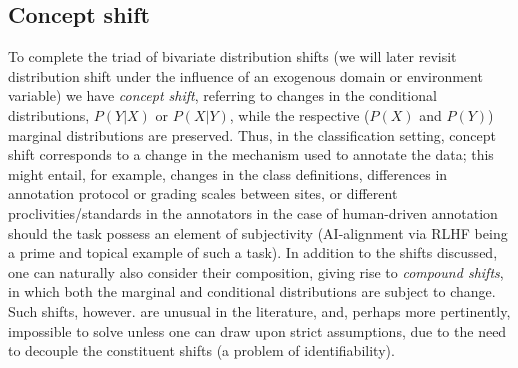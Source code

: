 \subsection{Concept shift}\label{ssec:concept-shift}
To complete the triad of bivariate distribution shifts (we will later revisit distribution shift
under the influence of an exogenous domain or environment variable) we have \emph{concept shift},
referring to changes in the conditional distributions, \( P(Y|X) \) or \( P(X|Y) \), while the
respective (\( P(X) \) and \( P(Y) \)) marginal distributions are preserved.
%
Thus, in the classification setting, concept shift corresponds to a change in the mechanism used to
annotate the data; this might entail, for example, changes in the class definitions, differences in
annotation protocol or grading scales between sites,  or different proclivities/standards in the
annotators in the case of human-driven annotation should the task possess an element of
subjectivity (AI-alignment via RLHF \citep{bai2022training} being a prime and topical example of
such a task).
%
In addition to the shifts discussed, one can naturally also consider their composition, giving rise
to \emph{compound shifts}, in which both the marginal and conditional distributions are subject to
change. Such shifts, however. are unusual in the literature, and, perhaps more pertinently,
impossible to solve unless one can draw upon strict assumptions, due to the need to decouple the
constituent shifts (a problem of identifiability).
%

